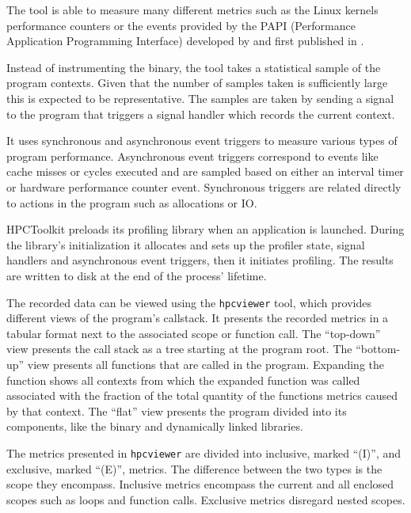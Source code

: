 \documentclass[a4paper, 11pt]{memoir}
\begin{document}
    The tool is able to measure many different metrics such as the Linux kernels performance counters or the events
    provided by the PAPI (Performance Application Programming Interface) developed by \citeauthor{papi}and first published
    in  \cite{papi}.

    Instead of instrumenting the binary, the tool takes a statistical sample of the program contexts. Given that the number
    of samples taken is sufficiently large this is expected to be representative. The samples are taken by sending a signal
    to the program that triggers a signal handler which records the current context.

    It uses synchronous and asynchronous event triggers to measure various types of program performance. Asynchronous
    event triggers correspond to events like cache misses or cycles executed and are sampled based on either an interval
    timer or hardware performance counter event. Synchronous triggers are related directly to actions in the program such
    as allocations or IO.

    HPCToolkit preloads its profiling library when an application is launched. During the library's initialization it
    allocates and sets up the profiler state, signal handlers and asynchronous event triggers, then it initiates profiling.
    The results are written to disk at the end of the process' lifetime.

    The recorded data can be viewed using the \texttt{hpcviewer} tool, which provides different views of the
    program's callstack. It presents the recorded metrics in a tabular format next to the associated scope or function
    call. The \enquote{top-down} view presents the call stack as a tree starting at the program root. The \enquote{bottom-up}
    view presents all functions that are called in the program. Expanding the function shows all contexts from which the
    expanded function was called associated with the fraction of the total quantity of the functions metrics caused by
    that context. The \enquote{flat} view presents the program divided into its components, like the binary and dynamically
    linked libraries.

    The metrics presented in \texttt{hpcviewer} are divided into inclusive, marked \enquote{(I)}, and exclusive,
    marked \enquote{(E)}, metrics. The difference between the two types is the scope they encompass. Inclusive metrics
    encompass the current and all enclosed scopes such as loops and function calls. Exclusive metrics disregard nested
    scopes.
\end{document}
